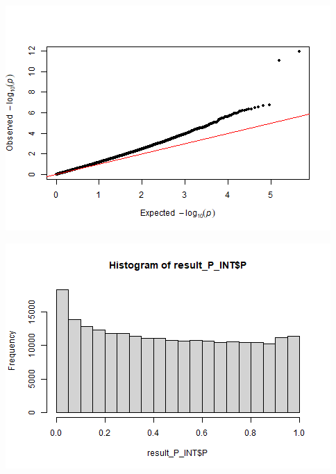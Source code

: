 \documentclass[
]{article}
\newenvironment{Shaded}{\begin{snugshade}}{\end{snugshade}}
\newcommand{\DataTypeTok}[1]{\textcolor[rgb]{0.13,0.29,0.53}{#1}}
\newcommand{\DecValTok}[1]{\textcolor[rgb]{0.00,0.00,0.81}{#1}}
\newcommand{\KeywordTok}[1]{\textcolor[rgb]{0.13,0.29,0.53}{\textbf{#1}}}
\newcommand{\NormalTok}[1]{#1}
\newcommand{\OperatorTok}[1]{\textcolor[rgb]{0.81,0.36,0.00}{\textbf{#1}}}
\newcommand{\StringTok}[1]{\textcolor[rgb]{0.31,0.60,0.02}{#1}}
\begin{document}
\includegraphics{stats-gene-research-progress-v9_files/figure-latex/OneCasualGene-2.png}

\begin{Shaded}
\end{Shaded}

\includegraphics{stats-gene-research-progress-v9_files/figure-latex/OneCasualGene-3.png}

\begin{Shaded}
\end{Shaded}
\end{document}
